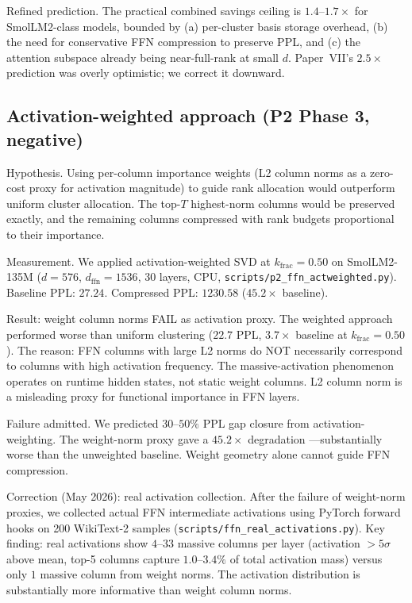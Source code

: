 \documentclass[11pt]{article}
\begin{document}
Refined prediction.  The practical combined savings ceiling is
$1.4$--$1.7{\times}$ for SmolLM2-class models, bounded by (a) per-cluster
basis storage overhead, (b) the need for conservative FFN compression to
preserve PPL, and (c) the attention subspace already being near-full-rank
at small $d$.  Paper~VII's $2.5{\times}$ prediction was overly
optimistic; we correct it downward.

\subsection{Activation-weighted approach (P2 Phase 3, negative)}
\label{sec:p2-negative}

Hypothesis.  Using per-column importance weights (L2 column norms
as a zero-cost proxy for activation magnitude) to guide rank allocation
would outperform uniform cluster allocation.  The top-$T$ highest-norm
columns would be preserved exactly, and the remaining columns compressed
with rank budgets proportional to their importance.

Measurement.  We applied activation-weighted SVD at
$k_\text{frac}{=}0.50$ on SmolLM2-135M ($d{=}576$, $d_\text{ffn}{=}1536$,
30 layers, CPU, \texttt{scripts/p2\_ffn\_actweighted.py}).
Baseline PPL: $27.24$.  Compressed PPL: $\mathbf{1230.58}$
($\mathbf{45.2{\times}}$ baseline).

Result: weight column norms FAIL as activation proxy.
The weighted approach performed worse than uniform clustering
($22.7$ PPL, $3.7{\times}$ baseline at $k_\text{frac}{=}0.50$).
The reason: FFN columns with large L2 norms do NOT necessarily correspond
to columns with high activation frequency.  The massive-activation
phenomenon~\cite{sun2024massive} operates on runtime hidden states, not
static weight columns.  L2 column norm is a misleading proxy for functional
importance in FFN layers.

Failure admitted.  We predicted $30$--$50\%$ PPL gap closure from
activation-weighting.  The weight-norm proxy gave a $45.2{\times}$ degradation
---substantially worse than the unweighted baseline.  Weight geometry alone
cannot guide FFN compression.

Correction (May 2026): real activation collection.  After the failure
of weight-norm proxies, we collected actual FFN intermediate activations using
PyTorch forward hooks on 200 WikiText-2 samples
(\texttt{scripts/ffn\_real\_activations.py}).  Key finding: real activations
show $4$--$33$ massive columns per layer (activation $>5\sigma$ above mean,
top-5 columns capture $1.0$--$3.4\%$ of total activation mass) versus only
$1$ massive column from weight norms.  The activation distribution is
substantially more informative than weight column norms.
\end{document}
